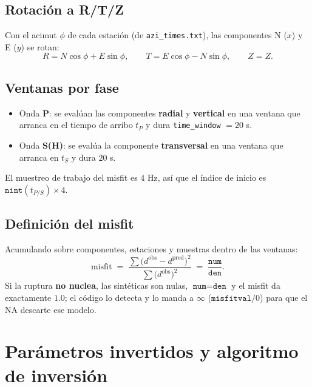 \documentclass[11pt,a4paper]{article}
\begin{document}
\subsection{Rotación a R/T/Z}
Con el acimut $\phi$ de cada estación (de \texttt{azi\_times.txt}), las
componentes N ($x$) y E ($y$) se rotan:
\begin{equation}
  R = N\cos\phi + E\sin\phi,\qquad
  T = E\cos\phi - N\sin\phi,\qquad
  Z = Z .
\end{equation}

\subsection{Ventanas por fase}
\begin{itemize}
  \item Onda \textbf{P}: se evalúan las componentes \textbf{radial} y
        \textbf{vertical} en una ventana que arranca en el tiempo de arribo
        $t_P$ y dura \texttt{time\_window} $=20$ s.
  \item Onda \textbf{S(H)}: se evalúa la componente \textbf{transversal} en una
        ventana que arranca en $t_S$ y dura $20$ s.
\end{itemize}
El muestreo de trabajo del misfit es $4$ Hz, así que el índice de inicio es
$\texttt{nint}(t_{P/S})\times 4$.

\subsection{Definición del misfit}
Acumulando sobre componentes, estaciones y muestras dentro de las ventanas:
\begin{equation}
  \text{misfit}
  \;=\; \frac{\displaystyle\sum \big(d^{\text{obs}}-d^{\text{pred}}\big)^2}
             {\displaystyle\sum \big(d^{\text{obs}}\big)^2}
  \;=\; \frac{\texttt{num}}{\texttt{den}} .
  \label{eq:misfit}
\end{equation}
Si la ruptura \textbf{no nuclea}, las sintéticas son nulas, $\texttt{num}=
\texttt{den}$ y el misfit da exactamente $1.0$; el código lo detecta y lo manda a
$\infty$ ($\texttt{misfitval}/0$) para que el NA descarte ese modelo.

\section{Parámetros invertidos y algoritmo de inversión}
\end{document}
